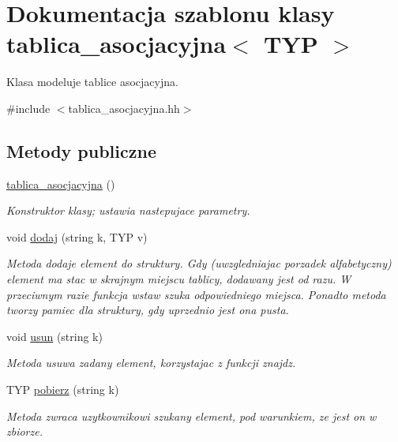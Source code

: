 \hypertarget{classtablica__asocjacyjna}{\section{Dokumentacja szablonu klasy tablica\-\_\-asocjacyjna$<$ T\-Y\-P $>$}
\label{classtablica__asocjacyjna}
}


Klasa modeluje tablice asocjacyjna.  




{\ttfamily \#include $<$tablica\-\_\-asocjacyjna.\-hh$>$}

\subsection*{Metody publiczne}
\begin{DoxyCompactItemize}
\item 
\hyperlink{classtablica__asocjacyjna_a9173f2b75f1933696247580da5e5c103}{tablica\-\_\-asocjacyjna} ()
\begin{DoxyCompactList}\small\item\em Konstruktor klasy; ustawia nastepujace parametry. \end{DoxyCompactList}\item 
void \hyperlink{classtablica__asocjacyjna_afab8557bd095ee1ba1756a5a195f8ca7}{dodaj} (string k, T\-Y\-P v)
\begin{DoxyCompactList}\small\item\em Metoda dodaje element do struktury. Gdy (uwzgledniajac porzadek alfabetyczny) element ma stac w skrajnym miejscu tablicy, dodawany jest od razu. W przeciwnym razie funkcja {\ttfamily wstaw} {\ttfamily szuka} odpowiedniego miejsca. Ponadto metoda tworzy pamiec dla struktury, gdy uprzednio jest ona pusta. \end{DoxyCompactList}\item 
void \hyperlink{classtablica__asocjacyjna_ae0d1ac59cdc7a7dd220672a246a7d8ad}{usun} (string k)
\begin{DoxyCompactList}\small\item\em Metoda usuwa zadany element, korzystajac z funkcji znajdz. \end{DoxyCompactList}\item 
T\-Y\-P \hyperlink{classtablica__asocjacyjna_a45b52661ed6e20e64a686fb55d9aa2f9}{pobierz} (string k)
\begin{DoxyCompactList}\small\item\em Metoda zwraca uzytkownikowi szukany element, pod warunkiem, ze jest on w zbiorze. \end{DoxyCompactList}\item 

\end{DoxyCompactItemize}
